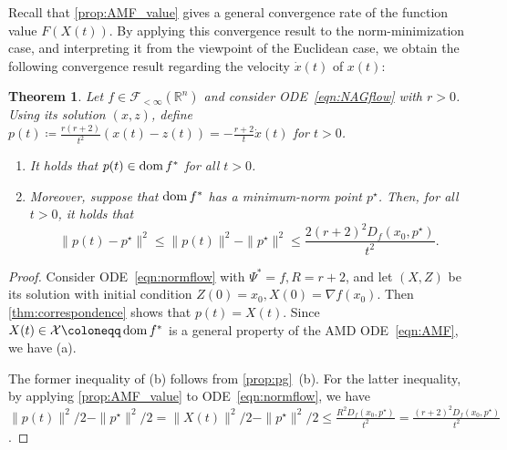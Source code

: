 \documentclass[11pt,a4paper]{article}
\theoremstyle{definition}
\theoremstyle{plain}
\newtheorem{thm}{Theorem}[section]
\newcommand{\RR}{{\mathbb{R}}}
\newcommand{\dom}{\mathop{\rm dom}}
\begin{document}
Recall that \cref{prop:AMF_value} gives a general convergence rate of the function value $F(X(t))$.
By applying this convergence result to the norm-minimization case, and interpreting it from the viewpoint of the Euclidean case, we obtain the following convergence result regarding the velocity $\dot x(t)$ of $x(t)$:
\begin{thm}
    \label{thm:correspondence-p}
    Let $f \in \mathcal{F}_{<\infty}(\RR^n)$ and consider ODE~\eqref{eqn:NAGflow} with $r > 0$.
    Using its solution $(x, z)$, define $p(t) \coloneqq \frac{r(r + 2)}{t^2}(x(t) - z(t)) = -\frac{r + 2}t\dot x(t)$ for $t > 0$.
    \begin{enumerate}
        \item[(a)] It holds that $p(t) \in \dom f^\ast$ for all $t > 0$.
        \item[(b)] Moreover, suppose that $\dom f^\ast$ has a minimum-norm point $p^\star$.
        Then, for all $t > 0$, it holds that
        \[
            \|p(t) - p^\star\|^2 \le \|p(t)\|^2 - \|p^\star\|^2 \le \frac{2(r + 2)^2D_f(x_0, p^\star)}{t^2}.
        \]
    \end{enumerate}
\end{thm}
\begin{proof}
    Consider ODE~\eqref{eqn:normflow} with $\Psi^\ast = f, R = r + 2$, and let $(X, Z)$ be its solution with initial condition $Z(0) = x_0, X(0) = \nabla f(x_0)$.
    Then \cref{thm:correspondence} shows that $p(t) = X(t)$.
    Since $X(t) \in \mathcal{X} \coloneqq \dom f^\ast$ is a general property of the AMD ODE~\eqref{eqn:AMF}, we have (a).

    The former inequality of (b) follows from \cref{prop:pg}~(b).
    For the latter inequality, by applying \cref{prop:AMF_value} to ODE~\eqref{eqn:normflow}, we have $\|p(t)\|^2/2 - \|p^\star\|^2/2 = \|X(t)\|^2/2 - \|p^\star\|^2/2 \le \frac{R^2D_f(x_0, p^\star)}{t^2} = \frac{(r + 2)^2D_f(x_0, p^\star)}{t^2}$.
\end{proof}
\end{document}
